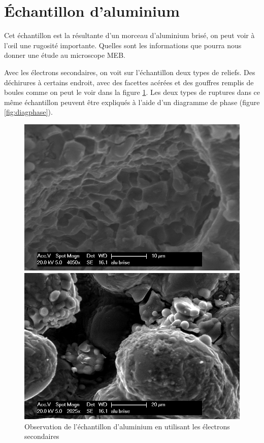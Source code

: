 \documentclass[a4paper,12pt]{article}
\begin{document}
\section{Échantillon d'aluminium}
Cet échantillon est la résultante d'un morceau d'aluminium brisé, on peut voir à l'œil une rugosité importante. Quelles sont les informations que pourra nous donner une étude au microscope MEB.

Avec les électrons secondaires, on voit sur l'échantillon deux types de reliefs. Des déchirures à certains endroit, avec des facettes acérées et des gouffres remplis de boules comme on peut le voir dans la figure \ref{fig:alu_reliefs}. Les deux types de ruptures dans ce même échantillon peuvent être expliqués à l'aide d'un diagramme de phase (figure \ref{fig:diagphase}).
\begin{figure}
\begin{minipage}[c]{.5\linewidth}
\centering
\includegraphics[width=1\textwidth]{images/alu_arretes.png}
 \end{minipage}\hfill
\begin{minipage}[c]{.5\linewidth}
\centering
\includegraphics[width=1\textwidth]{images/alu_brise.png}
\end{minipage}
\caption{Observation de l'échantillon d'aluminium en utilisant les électrons secondaires}
\label{fig:alu_reliefs}
\end{figure}
\end{document}
